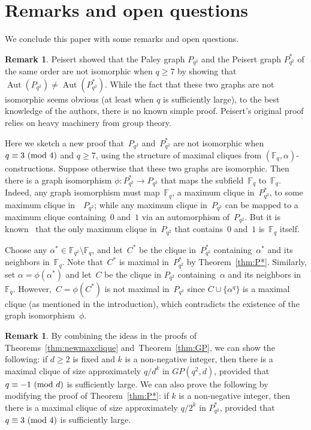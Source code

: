 \documentclass[12pt,reqno]{amsart}
\theoremstyle{definition}
\newtheorem{rem}[thm]{Remark}
\newcommand{\F}{\mathbb{F}}
\renewcommand{\pmod}[1]{{\ifmmode\text{\rm\ (mod~$#1$)}\else\discretionary{}{}{\hbox{ }}\rm(mod~$#1$)\fi}}
\begin{document}
\section{Remarks and open questions}\label{sec6}

We conclude this paper with some remarks and open questions.

\begin{rem}
Peisert \cite[Section 6]{P01} showed that the Paley graph $P_{q^2}$ and the Peisert graph $P^*_{q^2}$ of the same order are not isomorphic when $q \geq 7$ by showing that $\operatorname{Aut}(P_{q^2}) \neq \operatorname{Aut}(P^*_{q^2})$. While the fact that these two graphs are not isomorphic seems obvious (at least when $q$ is sufficiently large), to the best knowledge of the authors, there is no known simple proof. Peisert's original proof relies on heavy machinery from group theory. 

Here we sketch a new proof that~$P_{q^2}$ and~$P_{q^2}^*$ are not isomorphic when $q \equiv 3 \pmod 4$ and $q\geq 7$, using the structure of maximal cliques from $(\F_q,\alpha)$-constructions.
Suppose otherwise that these two graphs are isomorphic. Then there is a graph isomorphism $\phi\colon P_{q^2}^* \to P_{q^2}$ that maps the subfield~$\F_q$ to~$\F_q$. Indeed, any graph isomorphism must map~$\F_q$, a maximum clique in~$P_{q^2}^*$, to some maximum clique in~~$P_{q^2}$; while any maximum clique in~$P_{q^2}$ can be mapped to a maximum clique containing~$0$ and~$1$ via an automorphism of~$P_{q^2}$. But it is known~\cite{B84} that the only maximum clique in~$P_{q^2}$ that contains~$0$ and~$1$ is~$\F_q$ itself.

Choose any $\alpha^* \in \F_{q^2} \setminus \F_q$, and let~$C^*$ be the clique in~$P_{q^2}^*$ containing~$\alpha^*$ and its neighbors in~$\F_q$. Note that~$C^*$ is maximal in~$P_{q^2}^*$ by Theorem~\ref{thm:P*}. Similarly, set $\alpha=\phi(\alpha^*)$ and let~$C$ be the clique in $P_{q^2}$ containing~$\alpha$ and its neighbors in~$\F_q$. However,~$C=\phi(C^*)$ is not maximal in~$P_{q^2}$ since $C \cup \{\alpha^q\}$ is a maximal clique (as mentioned in the introduction), which contradicts the existence of the graph isomorphism~$\phi$. 
\end{rem} 

\begin{rem}\label{rem:more}
By combining the ideas in the proofs of Theorems~\ref{thm:newmaxclique} and~Theorem~\ref{thm:GP}, we can show the following: if $d \geq 2$ is fixed and $k$ is a non-negative integer, then there is a maximal clique of size approximately $q/d^k$ in $GP(q^2,d)$, provided that $q \equiv -1 \pmod d$ is sufficiently large. We can also prove the following by modifying the proof of Theorem~\ref{thm:P*}: if $k$ is a non-negative integer, then there is a maximal clique of size approximately $q/2^k$ in $P_{q^2}^*$, provided that $q \equiv 3 \pmod 4$ is sufficiently large.
\end{rem}
\end{document}
